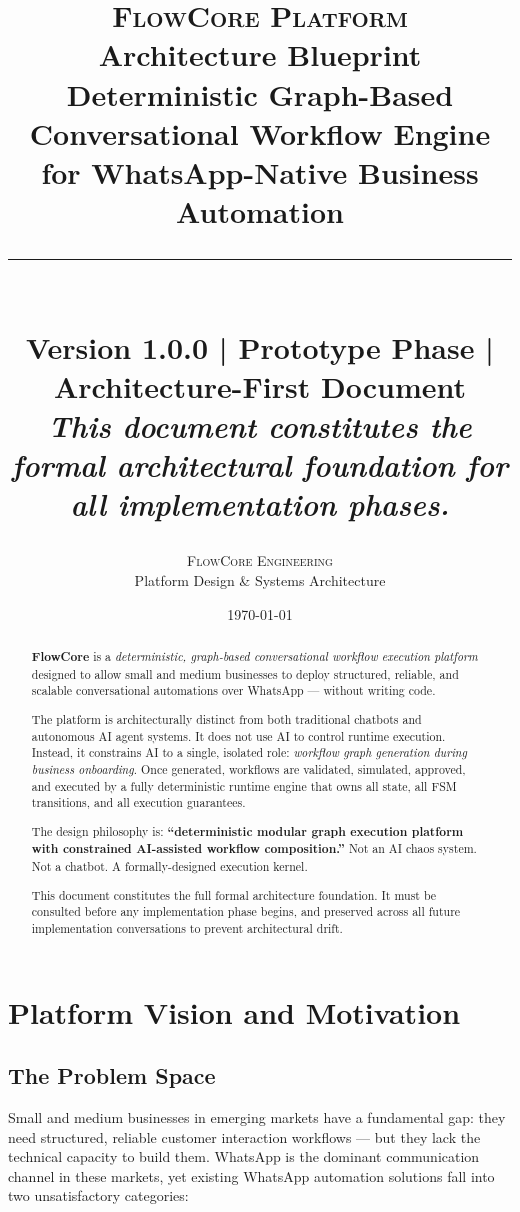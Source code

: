 \documentclass[12pt, a4paper]{report}
\title{
  \vspace{-1cm}
  {\Large \textsc{FlowCore Platform}} \\[0.4em]
  {\huge \textbf{Architecture Blueprint}} \\[0.6em]
  {\large Deterministic Graph-Based Conversational Workflow Engine} \\[0.4em]
  {\normalsize for WhatsApp-Native Business Automation} \\[1.5em]
  \rule{12cm}{0.4pt} \\[0.6em]
  {\small Version 1.0.0 \quad | \quad Prototype Phase \quad | \quad Architecture-First Document} \\[0.4em]
  {\small \textit{This document constitutes the formal architectural foundation for all implementation phases.}}
}
\author{
  \textsc{FlowCore Engineering} \\
  \small Platform Design \& Systems Architecture
}
\date{\today}
\begin{document}
\maketitle
\thispagestyle{empty}
\newpage

\begin{abstract}
\noindent
\textbf{FlowCore} is a \textit{deterministic, graph-based conversational workflow execution platform} designed to allow small and medium businesses to deploy structured, reliable, and scalable conversational automations over WhatsApp --- without writing code.

The platform is architecturally distinct from both traditional chatbots and autonomous AI agent systems. It does not use AI to control runtime execution. Instead, it constrains AI to a single, isolated role: \textit{workflow graph generation during business onboarding}. Once generated, workflows are validated, simulated, approved, and executed by a fully deterministic runtime engine that owns all state, all FSM transitions, and all execution guarantees.

The design philosophy is: \textbf{``deterministic modular graph execution platform with constrained AI-assisted workflow composition.''} Not an AI chaos system. Not a chatbot. A formally-designed execution kernel.

This document constitutes the full formal architecture foundation. It must be consulted before any implementation phase begins, and preserved across all future implementation conversations to prevent architectural drift.
\end{abstract}

\newpage
\tableofcontents
\newpage

\chapter{Platform Vision and Motivation}

\section{The Problem Space}

Small and medium businesses in emerging markets have a fundamental gap: they need structured, reliable customer interaction workflows --- but they lack the technical capacity to build them. WhatsApp is the dominant communication channel in these markets, yet existing WhatsApp automation solutions fall into two unsatisfactory categories:
\end{document}
